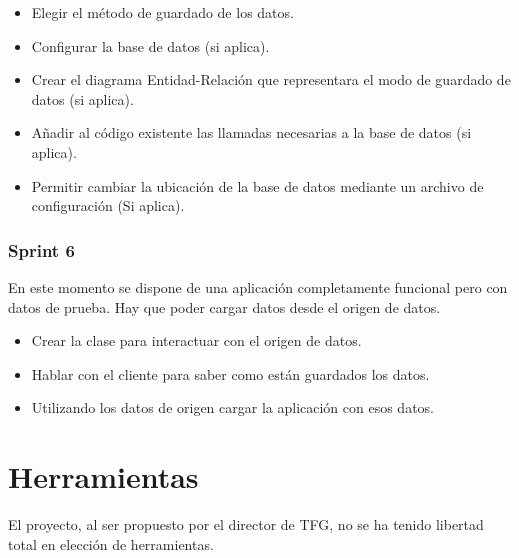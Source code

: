 \begin{itemize}
    \item Elegir el m\'etodo de guardado de los datos.
    \item Configurar la base de datos (si aplica).
    \item Crear el diagrama Entidad-Relaci\'{o}n que representara el modo de guardado de datos (si aplica).
    \item A\~{n}adir al c\'{o}digo existente las llamadas necesarias a la base de datos (si aplica).
    \item Permitir cambiar la ubicaci\'{o}n de la base de datos mediante un archivo de configuraci\'{o}n (Si aplica).
\end{itemize}

\subsubsection{Sprint 6}
En este momento se dispone de una aplicaci\'{o}n completamente funcional pero con datos de prueba. 
Hay que poder cargar datos desde el origen de datos.

\begin{itemize}
    \item Crear la clase para interactuar con el origen de datos.
    \item Hablar con el cliente para saber como est\'{a}n guardados los datos.
    \item Utilizando los datos de origen cargar la aplicaci\'{o}n con esos datos.
\end{itemize}

\section{Herramientas}
El proyecto, al ser propuesto por el director de TFG, no se ha tenido libertad total en elecci\'on de herramientas. 

